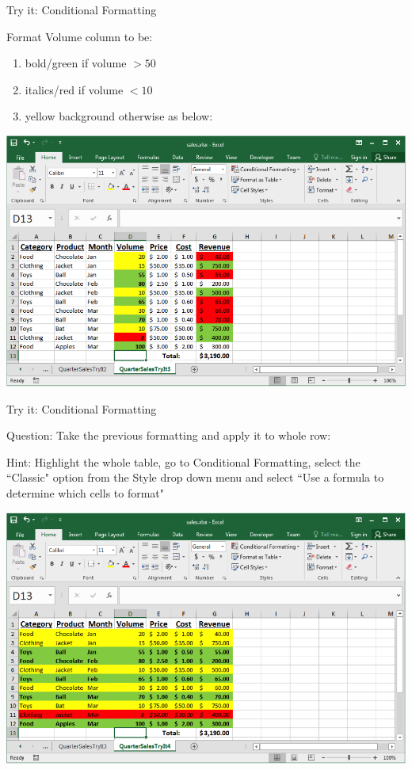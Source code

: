 \documentclass[xcolor=svgnames]{beamer}
\begin{document}
\begin{frame}{Try it: Conditional Formatting}
  \begin{exampleblock}{}{Format Volume column to be:}
\begin{enumerate}
\item bold/green if volume $> 50$
\item italics/red if volume $< 10$
\item yellow background otherwise as below:
\end{enumerate}
  \end{exampleblock}
\begin{center}
 \includegraphics[width=.8\textwidth]{CondFormatTryIt}
\end{center}
\end{frame}


\begin{frame}{Try it: Conditional Formatting}
  \begin{exampleblock}{Question:}
Take the previous formatting and apply it to whole row:
  \end{exampleblock}
  Hint: Highlight the whole table, go to Conditional Formatting, select the ``Classic" option from the Style drop down menu and select ``Use a formula to determine which cells to format"
\begin{center}
 \includegraphics[width=.8\textwidth]{QSTryIt4}
\end{center}
\end{frame}
\end{document}

